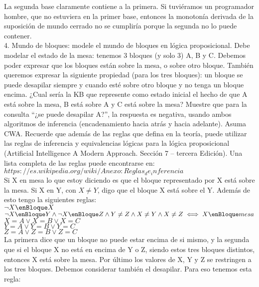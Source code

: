 La segunda base claramente contiene a la primera. Si tuviéramos un programador hombre, que no estuviera en la primer base, entonces la monotonía derivada de la suposición de mundo cerrado no se cumpliría porque la segunda no lo puede contener.\\

4. Mundo de bloques: modele el mundo de bloques en lógica proposicional. Debe modelar el estado de la mesa: tenemos 3 bloques (y solo 3) A, B y C. Debemos poder expresar que los bloques están sobre la mesa, o sobre otro bloque. También queremos expresar la siguiente propiedad (para los tres bloques): un bloque se puede desapilar siempre y cuando esté sobre otro bloque y no tenga un bloque encima. ¿Cual sería la KB que represente como estado inicial el hecho de que A está sobre la mesa, B está sobre A y C está sobre la mesa? Muestre que para la consulta “¿se puede desapilar A?”, la respuesta es negativa, usando ambos algoritmos de inferencia (encadenamiento hacia atrás y hacia adelante). Asuma CWA. Recuerde que además de las reglas que defina en la teoría, puede utilizar las reglas de inferencia y equivalencias lógicas para la lógica proposicional (Artificial Intelligence A Modern Approach. Sección 7 – tercera Edición). Una lista completa de las reglas puede encontrarse en: $https://es.wikipedia.org/wiki/Anexo:Reglas_de_inferencia$\\

Si X en mesa lo que estoy diciendo es que el bloque representado por X está sobre la mesa. Si X en Y, con $X \neq Y$, digo que el bloque X está sobre el Y. Además de esto tengo la siguientes reglas: \\

$\neg X \enBloque X$ \\

$\neg X \enBloque Y \wedge \neg X \enBloque Z \wedge Y \neq Z \wedge X \neq Y \wedge X \neq Z \iff X \enBloque mesa$ \\

$X = A \lor X = B \lor X = C$ \\

$Y = A \lor Y = B \lor Y = C$ \\

$Z = A \lor Z = B \lor Z = C$ \\

La primera dice que un bloque no puede estar encima de si mismo, y la segunda que si el bloque X no está en encima de Y o Z, siendo estos tres bloques distintos, entonces X está sobre la mesa. Por último los valores de X, Y y Z se restringen a los tres bloques. Debemos considerar también el desapilar. Para eso tenemos esta regla:\\

